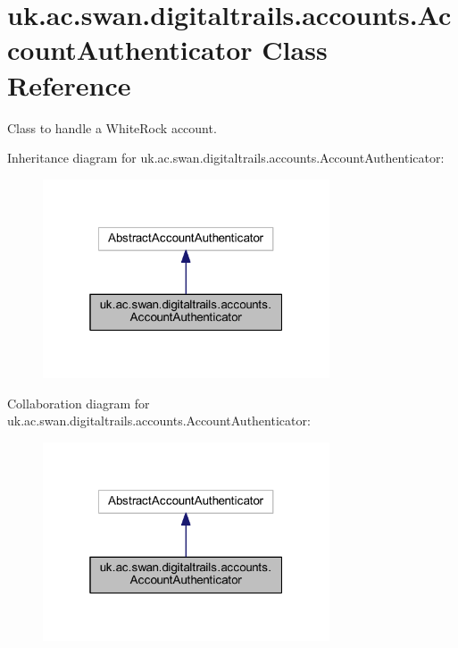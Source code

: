 \hypertarget{classuk_1_1ac_1_1swan_1_1digitaltrails_1_1accounts_1_1_account_authenticator}{\section{uk.\+ac.\+swan.\+digitaltrails.\+accounts.\+Account\+Authenticator Class Reference}
\label{classuk_1_1ac_1_1swan_1_1digitaltrails_1_1accounts_1_1_account_authenticator}
}


Class to handle a White\+Rock account.  




Inheritance diagram for uk.\+ac.\+swan.\+digitaltrails.\+accounts.\+Account\+Authenticator\+:\nopagebreak
\begin{figure}[H]
\begin{center}
\leavevmode
\includegraphics[width=241pt]{classuk_1_1ac_1_1swan_1_1digitaltrails_1_1accounts_1_1_account_authenticator__inherit__graph}
\end{center}
\end{figure}


Collaboration diagram for uk.\+ac.\+swan.\+digitaltrails.\+accounts.\+Account\+Authenticator\+:\nopagebreak
\begin{figure}[H]
\begin{center}
\leavevmode
\includegraphics[width=241pt]{classuk_1_1ac_1_1swan_1_1digitaltrails_1_1accounts_1_1_account_authenticator__coll__graph}
\end{center}
\end{figure}
